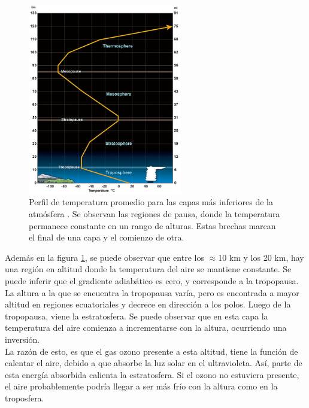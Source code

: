 \begin{figure}[htb!]
        \begin{center}
		\includegraphics[width=0.6\textwidth]{Figs/atmprofile.jpg}
        \end{center}
        \caption[Temperatura promedio para las capas inferiores de la atmósfera.]{Perfil de temperatura promedio para las capas más inferiores de la atmósfera \parencite{NOAA}. Se observan las regiones de pausa, donde la temperatura permanece constante en un rango de alturas. Estas brechas marcan el final de una capa y el comienzo de otra.}
        \label{fig:fig10}
\end{figure}

Además en la figura \ref{fig:fig10}, se puede observar que entre los $\approx$10 km y los 20 km, hay una región en altitud donde la temperatura del aire se mantiene constante. Se puede inferir que el gradiente adiabático es cero, y corresponde a la tropopausa. La altura a la que se encuentra la tropopausa varía, pero es encontrada a mayor altitud en regiones ecuatoriales y decrece en dirección a los polos. Luego de la tropopausa, viene la estratosfera. Se puede observar que en esta capa la temperatura del aire comienza a incrementarse con la altura, ocurriendo una inversión.\\

La razón de esto, es que el gas ozono presente a esta altitud, tiene la función de calentar el aire, debido a que absorbe la luz solar en el ultravioleta. Así, parte de esta energía absorbida calienta la estratosfera. Si el ozono no estuviera presente, el aire probablemente podría llegar a ser más frío con la altura como en la troposfera.\\

